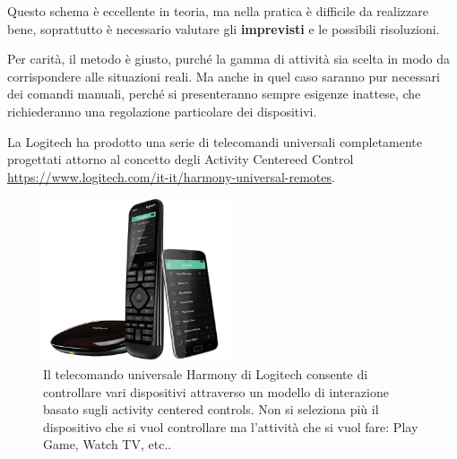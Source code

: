 Questo schema è eccellente in teoria, ma nella pratica è difficile da realizzare bene, soprattutto è necessario valutare gli \textbf{imprevisti} e le possibili risoluzioni.

Per carità, il metodo è giusto, purché la gamma di attività sia scelta in modo da corrispondere alle situazioni reali. Ma anche in quel caso saranno pur necessari dei comandi manuali, perché si presenteranno sempre esigenze inattese, che richiederanno una regolazione particolare dei dispositivi.

La Logitech ha prodotto una serie di telecomandi universali completamente progettati attorno al concetto degli Activity Centereed Control \url{https://www.logitech.com/it-it/harmony-universal-remotes}.

	\begin{figure}[!h]
	\centering
	\includegraphics[width=0.5\textwidth]{immagini/harmony.png}
	\caption{Il telecomando universale Harmony di Logitech consente di controllare vari dispositivi attraverso un modello di interazione basato sugli activity centered controls. Non si seleziona più il dispositivo che si vuol controllare ma l'attività che si vuol fare: Play Game, Watch TV, etc..}
\end{figure}
